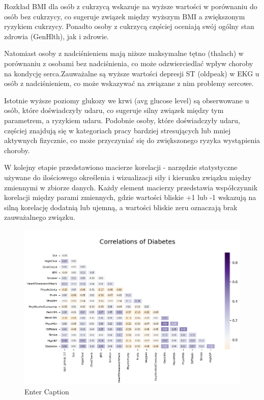 \documentclass[onecolumn,12pt]{article}
\begin{document}
Rozkład BMI dla osób z cukrzycą wskazuje na wyższe wartości w porównaniu do osób bez cukrzycy, co sugeruje związek między wyższym BMI a zwiększonym ryzykiem cukrzycy. Ponadto osoby z cukrzycą częściej oceniają swój ogólny stan zdrowia (GenHlth), jak i zdrowie.

Natomiast osoby z nadciśnieniem mają niższe maksymalne tętno (thalach) w porównaniu z osobami bez nadciśnienia, co może odzwierciedlać wpływ choroby na kondycję serca.Zauważalne są wyższe wartości depresji ST (oldpeak) w EKG u osób z nadciśnieniem, co może wskazywać na związane z nim problemy sercowe.

Istotnie wyższe poziomy glukozy we krwi (avg glucose level) są obserwowane u osób, które doświadczyły udaru, co sugeruje silny związek między tym parametrem, a ryzykiem udaru. Podobnie osoby, które doświadczyły udaru, częściej znajdują się w kategoriach pracy bardziej stresujących lub mniej aktywnych fizycznie, co może przyczyniać się do zwiększonego ryzyka wystąpienia choroby.

W kolejny etapie przedstawiono macierze korelacji - narzędzie statystyczne używane do ilościowego określenia i wizualizacji siły i kierunku związku między zmiennymi w zbiorze danych. Każdy element macierzy przedstawia współczynnik korelacji między parami zmiennych, gdzie wartości bliskie +1 lub -1 wskazują na silną korelację dodatnią lub ujemną, a wartości bliskie zeru oznaczają brak zauważalnego związku.



\begin{figure}
    \centering
    \includegraphics[width=0.9\linewidth]{raport/graphs/diabetes_corr.png}
    \caption{Enter Caption}
    \label{fig:enter-label}
\end{figure}
\end{document}
